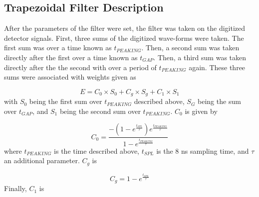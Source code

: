 \documentclass[../MaxHughesThesis.tex]{subfiles}
\begin{document}
\subsection{Trapezoidal Filter Description}
After the parameters of the filter were set, the filter was taken on the digitized detector signals.
First, three sums of the digitized wave-forms were taken.
The first sum was over a time known as $t_{PEAKING}$.
Then, a second sum was taken directly after the first over a time known as $t_{GAP}$.
Then, a third sum was taken directly after the the second with over a period of $t_{PEAKING}$ again.
These three sums were associated with weights given as \cite{Tan03} 

\begin{equation}
	E = C_{0} \times S_{0} + C_{g} \times S_{g} + C_{1} \times S_{1} 
	\label{eq:ensum}
\end{equation} 
%
with $S_{0}$ being the first sum over $t_{PEAKING}$ described above, $S_{G}$ being the sum over $t_{GAP}$, and $S_{1}$ being the second sum over $t_{PEAKING}$.
$C_{0}$ is given by 

\begin{equation}
	C_{0} = \frac{-(1 - e^{\frac{t_{SPL}}{\tau}})e^{\frac{t_{PEAKING}}{\tau}}}{1 - e^{\frac{t_{PEAKING}}{\tau}}}
	\label{eq:c0sum}
\end{equation}
%
where $t_{PEAKING}$ is the time described above, $t_{SPL}$ is the 8 ns sampling time, and $\tau$ an additional parameter.
$C_{g}$ is 

\begin{equation}
	C_{g} = 1 - e^{\frac{t_{SPL}}{\tau}}
	\label{eq:cgsum}
\end{equation}
%
Finally, $C_{1}$ is 
\end{document}
